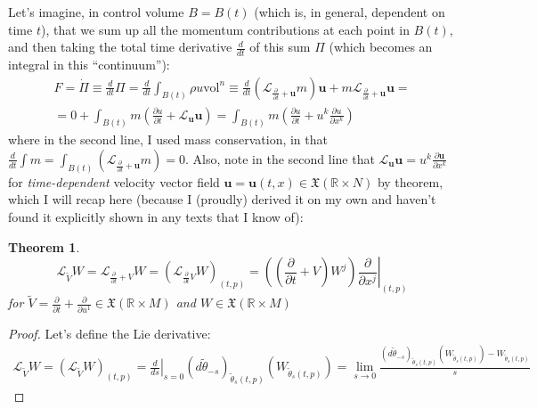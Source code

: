 \documentclass[twoside,landscape,10pt]{amsart}
\theoremstyle{plain}
\newtheorem{theorem}{Theorem}
\theoremstyle{definition}
\theoremstyle{remark}
\theoremstyle{remark}
\begin{document}
\begin{multicols*}{2}
Let's imagine, in control volume $B=B(t)$ (which is, in general, dependent on time $t$), that we sum up all the momentum contributions at each point in $B(t)$, and then taking the total time derivative $\frac{d}{dt}$ of this sum $\Pi$ (which becomes an integral in this ``continuum''):
\begin{equation}\label{Eq:F=ma}
\begin{gathered}
  F = \dot{\Pi} \equiv \frac{d}{dt} \Pi = \frac{d}{dt} \int_{B(t)} \rho u \text{vol}^n \equiv \frac{d}{dt} ( \mathcal{L}_{\frac{ \partial }{ \partial t} + \mathbf{u} } m ) \mathbf{u} + m \mathcal{L}_{ \frac{ \partial }{ \partial t} + \mathbf{u} } \mathbf{u} = \\
  = 0 + \int_{B(t)} m \left( \frac{ \partial u}{ \partial t} + \mathcal{L}_{\mathbf{u}} \mathbf{u}  \right) = \int_{B(t)} m \left( \frac{ \partial u }{ \partial t} + u^k \frac{ \partial u}{ \partial x^k} \right)
\end{gathered}
\end{equation}
where in the second line, I used mass conservation, in that $\frac{d}{dt} \int m = \int_{B(t)} \left( \mathcal{L}_{ \frac{ \partial }{ \partial t} + \mathbf{u} } m \right) = 0$.  Also, note in the second line that $\mathcal{L}_{\mathbf{u}} \mathbf{u} = u^k \frac{ \partial \mathbf{u}}{ \partial x^k}$ for \emph{time-dependent} velocity vector field $\mathbf{u} = \mathbf{u}(t,x) \in \mathfrak{X}(\mathbb{R} \times N)$ by theorem, which I will recap here (because I (proudly) derived it on my own and haven't found it explicitly shown in any texts that I know of):  

\begin{theorem}
\begin{equation}
\mathcal{L}_{\widetilde{V}}W = \mathcal{L}_{ \frac{ \partial }{ \partial t} +V}W = \left( \mathcal{L}_{ \frac{ \partial}{ \partial t} V } W \right)_{(t,p)} = \left( \left( \frac{ \partial }{ \partial t} + V \right) W^j \right) \left. \frac{ \partial }{ \partial x^j} \right|_{(t,p)}
\end{equation}
for $\widetilde{V} = \frac{ \partial }{ \partial t} + \frac{ \partial }{ \partial u^1} \in \mathfrak{X}(\mathbb{R} \times M)$  and $W \in \mathfrak{X}(\mathbb{R} \times M)$
\end{theorem}

\begin{proof}
Let's define the Lie derivative:
\begin{equation}
\begin{gathered}
  \mathcal{L}_{\widetilde{V}}W = (\mathcal{L}_{\widetilde{V}}W)_{(t,p)} = \left. \frac{d}{ds} \right|_{s=0}(d\widetilde{\theta}_{-s})_{\widetilde{\theta}_s(t,p)}(W_{\widetilde{\theta}_s(t,p)})   = \lim_{s\to 0} \frac{ (d\widetilde{\theta}_{-s})_{\widetilde{\theta}_s(t,p)}( W_{\widetilde{\theta}_s(t,p)}) - W_{\widetilde{\theta}_s(t,p)} }{s}
\end{gathered}
\end{equation}



\end{proof}
\end{multicols*}
\end{document}

